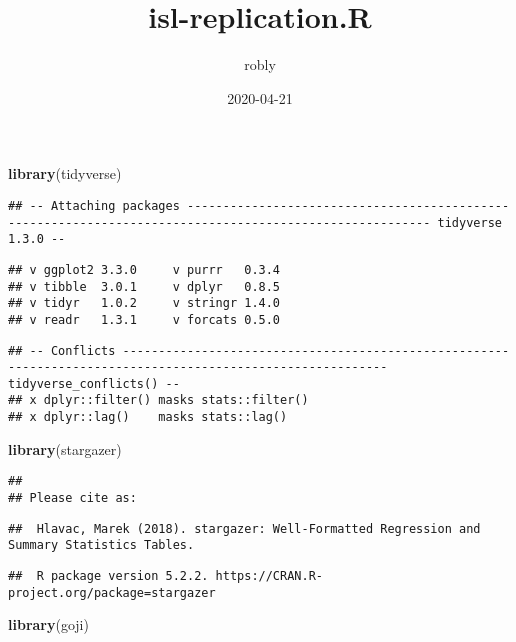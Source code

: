 \documentclass[
]{article}
\title{isl-replication.R}
\author{robly}
\date{2020-04-21}
\newenvironment{Shaded}{\begin{snugshade}}{\end{snugshade}}
\newcommand{\KeywordTok}[1]{\textcolor[rgb]{0.13,0.29,0.53}{\textbf{#1}}}
\newcommand{\NormalTok}[1]{#1}
\begin{document}
\maketitle

\begin{Shaded}
\begin{Highlighting}[]
\KeywordTok{library}\NormalTok{(tidyverse)}
\end{Highlighting}
\end{Shaded}

\begin{verbatim}
## -- Attaching packages -------------------------------------------------------------------------------------------------------- tidyverse 1.3.0 --
\end{verbatim}

\begin{verbatim}
## v ggplot2 3.3.0     v purrr   0.3.4
## v tibble  3.0.1     v dplyr   0.8.5
## v tidyr   1.0.2     v stringr 1.4.0
## v readr   1.3.1     v forcats 0.5.0
\end{verbatim}

\begin{verbatim}
## -- Conflicts ----------------------------------------------------------------------------------------------------------- tidyverse_conflicts() --
## x dplyr::filter() masks stats::filter()
## x dplyr::lag()    masks stats::lag()
\end{verbatim}

\begin{Shaded}
\begin{Highlighting}[]
\KeywordTok{library}\NormalTok{(stargazer)}
\end{Highlighting}
\end{Shaded}

\begin{verbatim}
## 
## Please cite as:
\end{verbatim}

\begin{verbatim}
##  Hlavac, Marek (2018). stargazer: Well-Formatted Regression and Summary Statistics Tables.
\end{verbatim}

\begin{verbatim}
##  R package version 5.2.2. https://CRAN.R-project.org/package=stargazer
\end{verbatim}

\begin{Shaded}
\begin{Highlighting}[]
\KeywordTok{library}\NormalTok{(goji)}
\end{Highlighting}
\end{Shaded}
\end{document}
